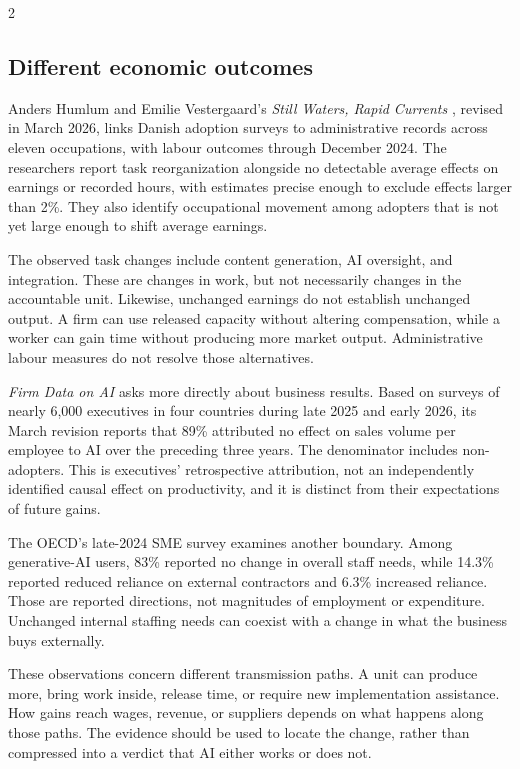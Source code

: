 \begin{multicols}{2}
\MeasurementArt

\subsection{Different economic
outcomes}\label{different-economic-outcomes}

Anders Humlum and Emilie Vestergaard's \emph{Still Waters, Rapid
Currents} \citep{humlum2026currents}, revised in March 2026, links
Danish adoption surveys to administrative records across eleven
occupations, with labour outcomes through December 2024. The researchers
report task reorganization alongside no detectable average effects on
earnings or recorded hours, with estimates precise enough to exclude
effects larger than 2\%. They also identify occupational movement among
adopters that is not yet large enough to shift average earnings.

The observed task changes include content generation, AI oversight, and
integration. These are changes in work, but not necessarily changes in
the accountable unit. Likewise, unchanged earnings do not establish
unchanged output. A firm can use released capacity without altering
compensation, while a worker can gain time without producing more market
output. Administrative labour measures do not resolve those
alternatives.

\emph{Firm Data on AI} \citep{yotzov2026firmdata} asks more directly
about business results. Based on surveys of nearly 6,000 executives in
four countries during late 2025 and early 2026, its March revision
reports that 89\% attributed no effect on sales volume per employee to
AI over the preceding three years. The denominator includes
non-adopters. This is executives' retrospective attribution, not an
independently identified causal effect on productivity, and it is
distinct from their expectations of future gains.

The OECD's late-2024 SME survey \citep{oecd2025smeworkforce} examines
another boundary. Among generative-AI users, 83\% reported no change in
overall staff needs, while 14.3\% reported reduced reliance on external
contractors and 6.3\% increased reliance. Those are reported directions,
not magnitudes of employment or expenditure. Unchanged internal staffing
needs can coexist with a change in what the business buys externally.

These observations concern different transmission paths. A unit can
produce more, bring work inside, release time, or require new
implementation assistance. How gains reach wages, revenue, or suppliers
depends on what happens along those paths. The evidence should be used
to locate the change, rather than compressed into a verdict that AI
either works or does not.


\end{multicols}
